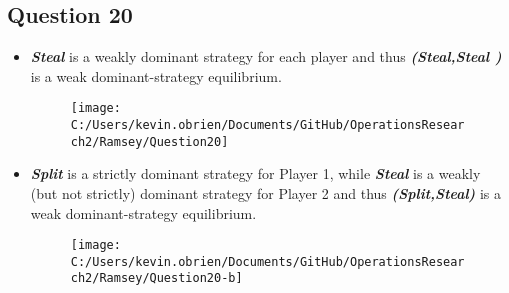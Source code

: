 \documentclass[]{report}
\begin{document}
\subsection*{Question 20}
\begin{itemize}
\item \textbf{\textit{Steal}} is a weakly dominant strategy for
each player and thus \textbf{\textit{(Steal,Steal )}} is a weak dominant-strategy equilibrium.
\begin{figure}[h!]
\centering
\texttt{[image: C:/Users/kevin.obrien/Documents/GitHub/OperationsResearch2/Ramsey/Question20]}

\end{figure}


\item \textbf{\textit{Split}} is a strictly dominant strategy for
Player 1, while \textbf{\textit{Steal}} is a weakly (but not strictly) dominant strategy for Player 2
and thus \textbf{\textit{(Split,Steal)}} is a weak dominant-strategy equilibrium.

\begin{figure}[h!]
	\centering
	\texttt{[image: C:/Users/kevin.obrien/Documents/GitHub/OperationsResearch2/Ramsey/Question20-b]}

\end{figure}
\end{itemize}
\end{document}
